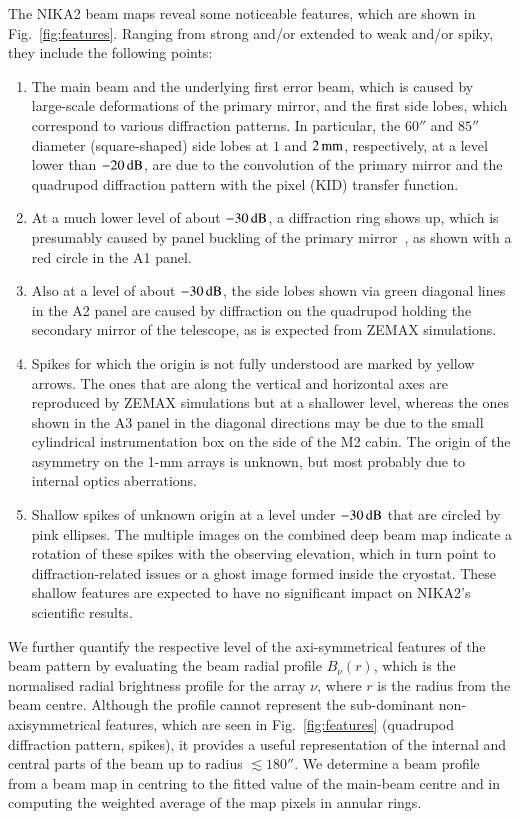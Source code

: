 \documentclass[traditionalabstract]{aa}
\newcommand{\lp}[1]{#1}
\begin{document}
{The NIKA2 beam maps reveal some noticeable features, which are
shown in Fig.~\ref{fig:features}. Ranging from strong and/or extended to
weak and/or spiky, they include the following points:
\begin{enumerate}
\item The main beam and the underlying first error
  beam, which is caused by large-scale deformations of the primary
  mirror, and the first side lobes, {\lp which correspond to various diffraction
  patterns. In particular, the $60''$ and $85''$ diameter (square-shaped) side
  lobes at $1$ and $2\,\rm{mm}$, respectively, at a level lower than
  $-20\,\rm{dB}$, are due to the convolution of the primary mirror and the
  quadrupod diffraction pattern with the pixel (KID) transfer function.}
\item At a much lower level of about $-30\,\rm{dB}$, a diffraction ring shows    
up, which is presumably caused by panel buckling of the primary 
  mirror~\citep{Greve2010}, as shown with a red circle in the A1 panel.
\item Also at a level of about $-30\,\rm{dB}$, the side lobes shown via green
  diagonal lines in the A2 panel are caused by diffraction on the
  quadrupod holding the secondary mirror of the telescope, as is expected
  from ZEMAX simulations.  
\item Spikes for which the origin is not fully understood are marked by yellow
  arrows. The ones that are along the vertical and
  horizontal axes are reproduced by ZEMAX simulations but at a 
  shallower level, whereas the ones shown in the A3 panel in the
  diagonal directions may be due to the small cylindrical
  instrumentation box on the side of the M2 cabin. The origin of the
  asymmetry on the 1-mm arrays is unknown, but most probably due to
  internal optics aberrations.
\item Shallow spikes of unknown origin at a level under $-30\,\rm{dB}$ that are circled by pink
  ellipses. The multiple images on the combined deep beam map indicate
  a rotation of these spikes with the observing elevation, which in
  turn point to diffraction-related issues or a ghost image
  formed inside the cryostat. These shallow features are expected to
  have no significant impact on NIKA2's scientific results.
\end{enumerate}

We further quantify the respective level of the axi-symmetrical
features of the beam pattern by evaluating the beam radial profile
$B_\nu(r)$, which is the normalised radial brightness profile for the
array $\nu$, where $r$ is the radius from the beam centre.
Although the profile cannot represent the sub-dominant non-axisymmetrical
features, which are seen in Fig.~\ref{fig:features} (quadrupod
diffraction pattern, spikes), it provides a useful
representation of the internal and central parts of the beam {\lp up to
 radius $\lesssim 180''$.} We determine a beam profile from a beam map in centring to
the fitted value of the main-beam centre and in computing the
weighted average of the map pixels in annular rings.

}
\end{document}
